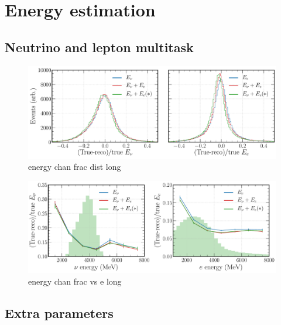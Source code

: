 \section{Energy estimation} %
\label{sec:cvn_energy} %

\subsection{Neutrino and lepton multitask} %
\label{sec:cvn_energy_chan} %

\begin{figure} %
    \includegraphics[width=\textwidth]{diagrams/7-cvn/chipsnet/energy_chan_frac_dist.pdf}
    \caption[energy chan frac dist short]
    {energy chan frac dist long}
    \label{fig:energy_chan_frac_dist}
\end{figure}

\begin{figure} %
    \includegraphics[width=\textwidth]{diagrams/7-cvn/chipsnet/energy_chan_frac_vs_e.pdf}
    \caption[energy chan frac vs e short]
    {energy chan frac vs e long}
    \label{fig:energy_chan_frac_vs_e}
\end{figure}

\subsection{Extra parameters} %
\label{sec:cvn_energy_par} %

